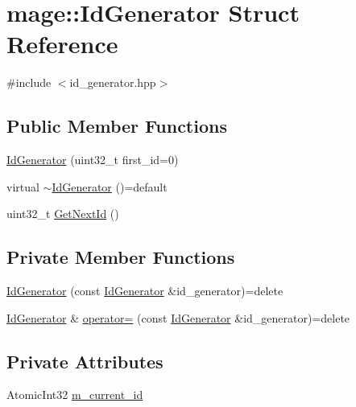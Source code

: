 \hypertarget{structmage_1_1_id_generator}{}\section{mage\+:\+:Id\+Generator Struct Reference}
\label{structmage_1_1_id_generator}


{\ttfamily \#include $<$id\+\_\+generator.\+hpp$>$}

\subsection*{Public Member Functions}
\begin{DoxyCompactItemize}
\item 
\hyperlink{structmage_1_1_id_generator_aede1dd978436b3e108646896666e177e}{Id\+Generator} (uint32\+\_\+t first\+\_\+id=0)
\item 
virtual \hyperlink{structmage_1_1_id_generator_a0ee9bddbf4cdedccc0fe70071c5c91b5}{$\sim$\+Id\+Generator} ()=default
\item 
uint32\+\_\+t \hyperlink{structmage_1_1_id_generator_a4c6252edb5d33c68603893f2a03ad25d}{Get\+Next\+Id} ()
\end{DoxyCompactItemize}
\subsection*{Private Member Functions}
\begin{DoxyCompactItemize}
\item 
\hyperlink{structmage_1_1_id_generator_a6f502d2cd8b63e7c76f31834b028a11d}{Id\+Generator} (const \hyperlink{structmage_1_1_id_generator}{Id\+Generator} \&id\+\_\+generator)=delete
\item 
\hyperlink{structmage_1_1_id_generator}{Id\+Generator} \& \hyperlink{structmage_1_1_id_generator_a370c8289f38a534006e8b9ca7ec78026}{operator=} (const \hyperlink{structmage_1_1_id_generator}{Id\+Generator} \&id\+\_\+generator)=delete
\end{DoxyCompactItemize}
\subsection*{Private Attributes}
\begin{DoxyCompactItemize}
\item 
Atomic\+Int32 \hyperlink{structmage_1_1_id_generator_ab094c8e57444d4fa02d5f3c2a5ea25f3}{m\+\_\+current\+\_\+id}
\end{DoxyCompactItemize}


